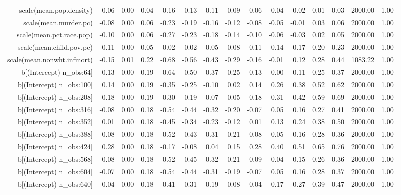 \begin{table}[ht]
\begin{tabular}{rrrrrrrrrrrrrrr}
  scale(mean.pop.density) & -0.06 & 0.00 & 0.04 & -0.16 & -0.13 & -0.11 & -0.09 & -0.06 & -0.04 & -0.02 & 0.01 & 0.03 & 2000.00 & 1.00 \\ 
  scale(mean.murder.pc) & -0.08 & 0.00 & 0.06 & -0.23 & -0.19 & -0.16 & -0.12 & -0.08 & -0.05 & -0.01 & 0.03 & 0.06 & 2000.00 & 1.00 \\ 
  scale(mean.pct.race.pop) & -0.10 & 0.00 & 0.06 & -0.27 & -0.23 & -0.18 & -0.14 & -0.10 & -0.06 & -0.03 & 0.02 & 0.05 & 2000.00 & 1.00 \\ 
  scale(mean.child.pov.pc) & 0.11 & 0.00 & 0.05 & -0.02 & 0.02 & 0.05 & 0.08 & 0.11 & 0.14 & 0.17 & 0.20 & 0.23 & 2000.00 & 1.00 \\ 
  scale(mean.nonwht.infmort) & -0.15 & 0.01 & 0.22 & -0.68 & -0.56 & -0.43 & -0.29 & -0.16 & -0.01 & 0.12 & 0.28 & 0.44 & 1083.22 & 1.00 \\ 
  b[(Intercept) n\_obs:64] & -0.13 & 0.00 & 0.19 & -0.64 & -0.50 & -0.37 & -0.25 & -0.13 & -0.00 & 0.11 & 0.25 & 0.37 & 2000.00 & 1.00 \\ 
  b[(Intercept) n\_obs:100] & 0.14 & 0.00 & 0.19 & -0.35 & -0.25 & -0.10 & 0.02 & 0.14 & 0.26 & 0.38 & 0.52 & 0.62 & 2000.00 & 1.00 \\ 
  b[(Intercept) n\_obs:208] & 0.18 & 0.00 & 0.19 & -0.30 & -0.19 & -0.07 & 0.05 & 0.18 & 0.31 & 0.42 & 0.59 & 0.69 & 2000.00 & 1.00 \\ 
  b[(Intercept) n\_obs:316] & -0.08 & 0.00 & 0.18 & -0.54 & -0.44 & -0.32 & -0.20 & -0.07 & 0.05 & 0.16 & 0.27 & 0.41 & 2000.00 & 1.00 \\ 
  b[(Intercept) n\_obs:352] & 0.01 & 0.00 & 0.18 & -0.45 & -0.34 & -0.23 & -0.12 & 0.01 & 0.13 & 0.24 & 0.38 & 0.50 & 2000.00 & 1.00 \\ 
  b[(Intercept) n\_obs:388] & -0.08 & 0.00 & 0.18 & -0.52 & -0.43 & -0.31 & -0.21 & -0.08 & 0.05 & 0.16 & 0.28 & 0.36 & 2000.00 & 1.00 \\ 
  b[(Intercept) n\_obs:424] & 0.28 & 0.00 & 0.18 & -0.17 & -0.08 & 0.04 & 0.15 & 0.28 & 0.40 & 0.51 & 0.65 & 0.76 & 2000.00 & 1.00 \\ 
  b[(Intercept) n\_obs:568] & -0.08 & 0.00 & 0.18 & -0.52 & -0.45 & -0.32 & -0.21 & -0.09 & 0.04 & 0.15 & 0.26 & 0.36 & 2000.00 & 1.00 \\ 
  b[(Intercept) n\_obs:604] & -0.07 & 0.00 & 0.18 & -0.54 & -0.44 & -0.31 & -0.19 & -0.07 & 0.05 & 0.16 & 0.28 & 0.37 & 2000.00 & 1.00 \\ 
  b[(Intercept) n\_obs:640] & 0.04 & 0.00 & 0.18 & -0.41 & -0.31 & -0.19 & -0.08 & 0.04 & 0.17 & 0.27 & 0.39 & 0.47 & 2000.00 & 1.00 \\ 

\end{tabular}
\end{table}

